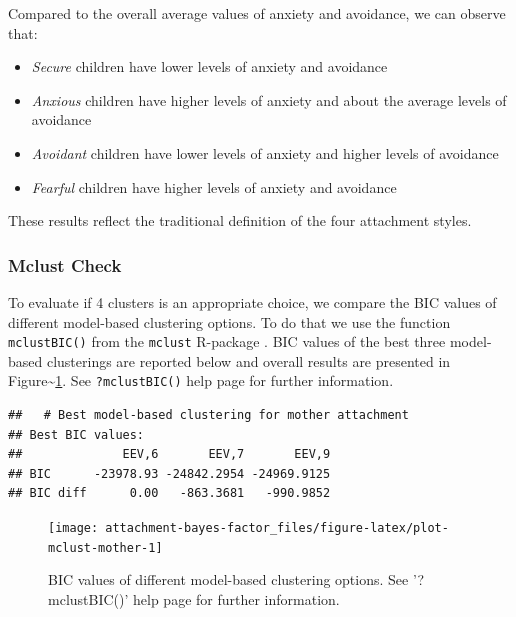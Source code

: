 \documentclass[
]{book}
\providecommand{\tightlist}{%
  \setlength{\itemsep}{0pt}\setlength{\parskip}{0pt}}
\begin{document}
Compared to the overall average values of anxiety and avoidance, we can observe that:

\begin{itemize}
\tightlist
\item
  \emph{Secure} children have lower levels of anxiety and avoidance
\item
  \emph{Anxious} children have higher levels of anxiety and about the average levels of avoidance
\item
  \emph{Avoidant} children have lower levels of anxiety and higher levels of avoidance
\item
  \emph{Fearful} children have higher levels of anxiety and avoidance
\end{itemize}

These results reflect the traditional definition of the four attachment styles.

\hypertarget{mclust-check}{%
\subsubsection*{Mclust Check}\label{mclust-check}}

To evaluate if 4 clusters is an appropriate choice, we compare the BIC values of different model-based clustering options. To do that we use the function \texttt{mclustBIC()} from the \texttt{mclust} R-package \citep{scruccaMclustClusteringClassification2016}. BIC values of the best three model-based clusterings are reported below and overall results are presented in Figure\textasciitilde\ref{fig:plot-mclust-mother}. See \texttt{?mclustBIC()} help page for further information.

\begin{verbatim}
##   # Best model-based clustering for mother attachment
## Best BIC values:
##              EEV,6       EEV,7       EEV,9
## BIC      -23978.93 -24842.2954 -24969.9125
## BIC diff      0.00   -863.3681   -990.9852
\end{verbatim}

\begin{figure}

{\centering \texttt{[image: attachment-bayes-factor\_files/figure-latex/plot-mclust-mother-1]} 

}

\caption{BIC values of different model-based clustering options. See '?mclustBIC()' help page for further information.}\label{fig:plot-mclust-mother}
\end{figure}
\end{document}
